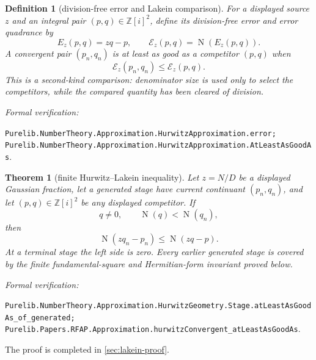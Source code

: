 \documentclass[11pt]{article}
\newtheorem{theorem}{Theorem}[section]
\newtheorem{definition}[definition]{Definition}
\newcommand{\Zi}{\mathbb{Z}[i]}
\newcommand{\Norm}[1]{\operatorname{N}\!\left(#1\right)}
\newcommand{\leanref}[1]{\par\smallskip\noindent
  \emph{Formal verification:}\par\nobreak
  {\raggedright\nolinkurl{#1}.\par}}
\begin{document}
\begin{definition}[division-free error and Lakein comparison]
\label{def:lakein-comparison}
For a displayed source $z$ and an integral pair $(p,q)\in\Zi^2$, define its
division-free error and error quadrance by
\[
             E_z(p,q)=zq-p,
             \qquad \mathcal E_z(p,q)=\Norm{E_z(p,q)}.
\]
A convergent pair $(p_n,q_n)$ is \emph{at least as good as} a competitor
$(p,q)$ when
\[
                      \mathcal E_z(p_n,q_n)
                      \le\mathcal E_z(p,q).
\]
This is a second-kind comparison: denominator size is used only to select the
competitors, while the compared quantity has been cleared of division.
\end{definition}

\leanref{Purelib.NumberTheory.Approximation.HurwitzApproximation.error;
Purelib.NumberTheory.Approximation.HurwitzApproximation.AtLeastAsGoodAs}

\begin{theorem}[finite Hurwitz--Lakein inequality]
\label{thm:finite-lakein}
Let $z=N/D$ be a displayed Gaussian fraction, let a generated stage have
current continuant $(p_n,q_n)$, and let $(p,q)\in\Zi^2$ be any displayed
competitor.  If
\[
                         q\ne0,
              \qquad    \Norm q<\Norm{q_n},
\]
then
\begin{equation}
\label{eq:finite-lakein}
                        \Norm{zq_n-p_n}
                     \le\Norm{zq-p}.
\end{equation}
At a terminal stage the left side is zero.  Every earlier generated stage is
covered by the finite fundamental-square and Hermitian-form invariant proved
below.
\end{theorem}

\leanref{Purelib.NumberTheory.Approximation.HurwitzGeometry.Stage.atLeastAsGoodAs_of_generated;
Purelib.Papers.RFAP.Approximation.hurwitzConvergent_atLeastAsGoodAs}

The proof is completed in \cref{sec:lakein-proof}.
\end{document}
